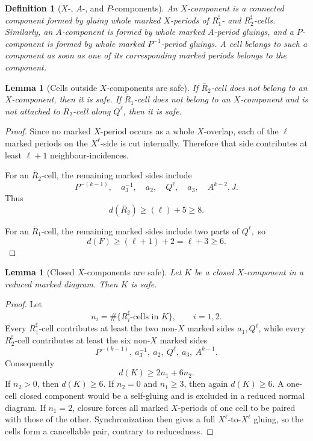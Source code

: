 \documentclass{article}
\newtheorem{lm}[theorem]{Lemma}
\newtheorem{df}[theorem]{Definition}
\begin{document}
\begin{df}[$X$-, $A$-, and $P$-components]
An $X$-component is a connected component formed by gluing whole marked
$X$-periods of $R_1^{\sharp}$- and $R_2^{\sharp}$-cells.  Similarly, an $A$-component is formed
by whole marked $A$-period gluings, and a $P$-component is formed by whole
marked $P^{-1}$-period gluings.  A cell belongs to such a component as soon
as one of its corresponding marked periods belongs to the component.
\end{df}

\begin{lm}[Cells outside $X$-components are safe]
If $\overline R_2$-cell does not
belong to an $X$-component, then it is safe.  If $\overline R_1$-cell does not
belong to an $X$-component and is not attached to $\overline R_2$-cell along $Q^{\ell}$, then it is safe.
\end{lm}

\begin{proof}
Since no marked $X$-period occurs as a whole $X$-overlap, each of the
$\ell$ marked periods on the $X^{\ell}$-side is cut internally.  Therefore
that side contributes at least $\ell+1$ neighbour-incidences.

For an $\overline R_2$-cell, the remaining marked sides include
\[
 P^{-(k-1)},\quad a_3^{-1},\quad a_2,\quad Q^{\ell},
 \quad a_3,\quad A^{k-2}, J.
\]
Thus
\[
        d(\overline R_2)\geq(\ell )+5\geq 8.
\]

For an $\overline R_1$-cell, the remaining marked sides include two parts of
\(
        Q^{\ell},
\)
so
\[
        d(F)\geq (\ell+1)+2=\ell+3\geq6.
\]


\end{proof}

\begin{lm}[Closed $X$-components are safe]
Let $K$ be a closed $X$-component in a reduced marked diagram.  Then $K$ is
safe.
\end{lm}

\begin{proof}
Let
\[
        n_i=\#\{R_i^{\sharp}\text{-cells in }K\},\qquad i=1,2.
\]
Every $R_1^{\sharp}$-cell contributes at least the two non-$X$ marked sides
$a_1,Q^{\ell}$, while every $R_2^{\sharp}$-cell contributes at least the six
non-$X$ marked sides
\[
 P^{-(k-1)},\ a_3^{-1},\ a_2,\ Q^{\ell},\ a_3,\ A^{k-1}.
\]
Consequently
\[
        d(K)\geq2n_1+6n_2.
\]
If $n_2>0$, then $d(K)\geq6$.  If $n_2=0$ and $n_1\geq3$, then again
$d(K)\geq6$.  A one-cell closed component would be a self-gluing and is
excluded in a reduced normal diagram.  If $n_1=2$, closure forces all
marked $X$-periods of one cell to be paired with those of the other.
Synchronization then gives a full $X^{\ell}$-to-$X^{\ell}$ gluing, so the
cells form a cancellable pair, contrary to reducedness.
\end{proof}
\end{document}
